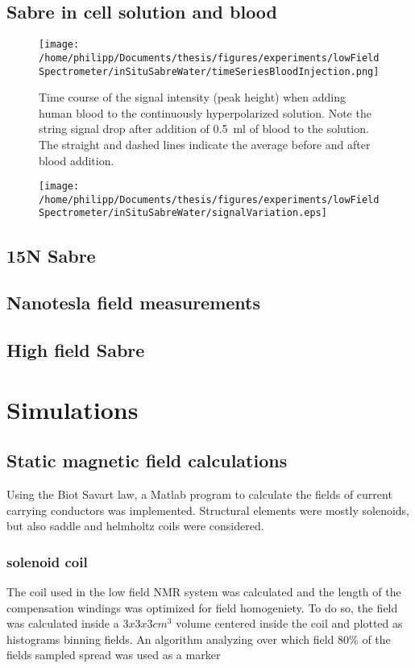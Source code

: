 	\subsection{Sabre in cell solution and blood}
	\begin{figure}[h]
		\texttt{[image: /home/philipp/Documents/thesis/figures/experiments/lowFieldSpectrometer/inSituSabreWater/timeSeriesBloodInjection.png]}
		\caption{Time course of the signal intensity (peak height) when adding human blood to the continuously hyperpolarized solution. Note the string signal drop after addition of \SI{0.5}{\milli\litre} of blood to the solution. The straight and dashed lines indicate the average before and after blood addition.}
		\label{chap:MaterialsAndMethods:bloodInjection}
	\end{figure}
	\begin{figure}[h]
		\texttt{[image: /home/philipp/Documents/thesis/figures/experiments/lowFieldSpectrometer/inSituSabreWater/signalVariation.eps]}
		\label{chap:MaterialsAndMethods:bloodInjection2}
	\end{figure}
	\subsection{15N Sabre}
	\subsection{Nanotesla field measurements}
	\subsection{High field Sabre}
\section{Simulations}
		\subsection{Static magnetic field calculations}
			Using the Biot Savart law, a Matlab program to calculate the fields of current carrying conductors was implemented. Structural elements were mostly solenoids, but also saddle and helmholtz coils were considered.
			\subsubsection{solenoid coil}
				The coil used in the low field NMR system was calculated and the length of the compensation windings was optimized for field homogeniety. To do so, the field was calculated inside a $3 x 3 x 3 cm^3$ volume centered inside the coil and plotted as histograms binning fields. An algorithm analyzing over which field 80\% of the fields sampled spread was used as a marker
				\begin{figure}
				\end{figure}
%
